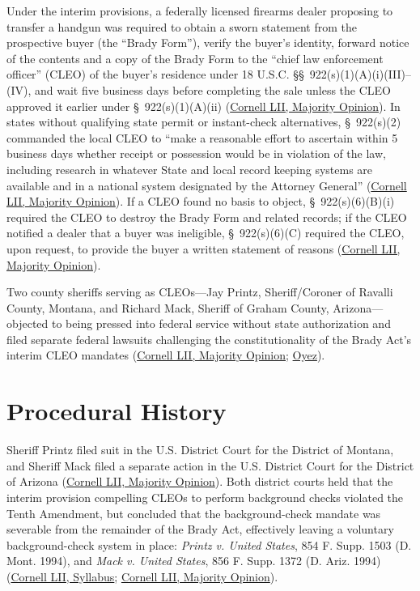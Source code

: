 \documentclass[12pt]{article}
\begin{document}
Under the interim provisions, a federally licensed firearms dealer proposing to transfer a handgun was required to obtain a sworn statement from the prospective buyer (the ``Brady Form''), verify the buyer's identity, forward notice of the contents and a copy of the Brady Form to the ``chief law enforcement officer'' (CLEO) of the buyer's residence under 18 U.S.C. \S\S\ 922(s)(1)(A)(i)(III)--(IV), and wait five business days before completing the sale unless the CLEO approved it earlier under \S\ 922(s)(1)(A)(ii) (\href{https://www.law.cornell.edu/supct/html/95-1478.ZO.html}{Cornell LII, Majority Opinion}). In states without qualifying state permit or instant-check alternatives, \S\ 922(s)(2) commanded the local CLEO to ``make a reasonable effort to ascertain within 5 business days whether receipt or possession would be in violation of the law, including research in whatever State and local record keeping systems are available and in a national system designated by the Attorney General'' (\href{https://www.law.cornell.edu/supct/html/95-1478.ZO.html}{Cornell LII, Majority Opinion}). If a CLEO found no basis to object, \S\ 922(s)(6)(B)(i) required the CLEO to destroy the Brady Form and related records; if the CLEO notified a dealer that a buyer was ineligible, \S\ 922(s)(6)(C) required the CLEO, upon request, to provide the buyer a written statement of reasons (\href{https://www.law.cornell.edu/supct/html/95-1478.ZO.html}{Cornell LII, Majority Opinion}).

Two county sheriffs serving as CLEOs---Jay Printz, Sheriff/Coroner of Ravalli County, Montana, and Richard Mack, Sheriff of Graham County, Arizona---objected to being pressed into federal service without state authorization and filed separate federal lawsuits challenging the constitutionality of the Brady Act's interim CLEO mandates (\href{https://www.law.cornell.edu/supct/html/95-1478.ZO.html}{Cornell LII, Majority Opinion}; \href{https://www.oyez.org/cases/1996/95-1478}{Oyez}).

\section{Procedural History}
Sheriff Printz filed suit in the U.S. District Court for the District of Montana, and Sheriff Mack filed a separate action in the U.S. District Court for the District of Arizona (\href{https://www.law.cornell.edu/supct/html/95-1478.ZO.html}{Cornell LII, Majority Opinion}). Both district courts held that the interim provision compelling CLEOs to perform background checks violated the Tenth Amendment, but concluded that the background-check mandate was severable from the remainder of the Brady Act, effectively leaving a voluntary background-check system in place: \textit{Printz v. United States}, 854 F. Supp. 1503 (D. Mont. 1994), and \textit{Mack v. United States}, 856 F. Supp. 1372 (D. Ariz. 1994) (\href{https://www.law.cornell.edu/supct/html/95-1478.ZS.html}{Cornell LII, Syllabus}; \href{https://www.law.cornell.edu/supct/html/95-1478.ZO.html}{Cornell LII, Majority Opinion}).
\end{document}
